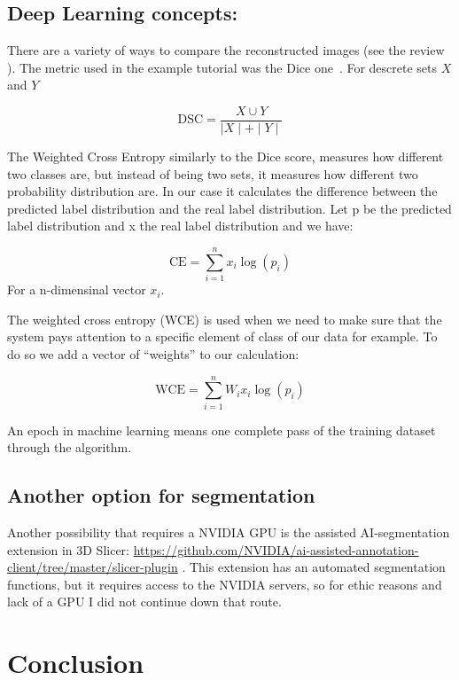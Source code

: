 \documentclass[12pt]{article}
\begin{document}
\subsection{Deep Learning concepts:}

There are a variety of ways to compare the reconstructed images (see
the review~\cite{taha2015metrics} ).  The metric used in the example
tutorial was the Dice one~\cite{zijdenbos1994morphometric}.
For descrete sets $X$ and $Y$ 

\begin{equation}
\mbox{DSC} = \frac{X \cup  Y} {\mid X \mid + \mid Y \mid }
\end{equation}
  
The Weighted Cross Entropy  similarly to the Dice score,
measures how different two classes are, but instead of being two sets,
it measures how different two probability distribution are. In our
case it calculates the difference between the predicted label
distribution and the real label distribution. Let p be the predicted
label distribution and x the real label distribution and we have:

\begin{equation}
\mbox{CE} = \sum_{i=1}^{n} x_i \log(p_i)
\end{equation}
For a n-dimensinal vector $x_i$.

The weighted cross entropy (WCE) is used when we need to make sure
that the system pays attention to a specific element of class of our
data for example. To do so we add a vector of “weights” to our
calculation:

\begin{equation}
\mbox{WCE} = \sum_{i=1}^{n} W_i x_i \log(p_i)
\end{equation}

An epoch in machine learning means one complete pass of the training
dataset through the algorithm.


\subsection{Another option for segmentation}

Another possibility that requires a NVIDIA GPU is the assisted
AI-segmentation extension in 3D Slicer:
\url{https://github.com/NVIDIA/ai-assisted-annotation-client/tree/master/slicer-plugin}
.
This extension has an automated segmentation functions, but it
requires access to the NVIDIA servers, so for ethic reasons and lack
of a GPU I did not continue down that route.

\section{Conclusion}



\end{document}
